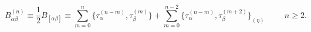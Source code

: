 \begin{equation}
  B_{\alpha\beta}^{(n)}\equiv
  \frac{1}{2}B_{[\alpha\beta]}\equiv \sum_{m=0}^n \{\tau_\alpha ^{(n-m)}, \tau_\beta
  ^{(m)}\}+\sum_{m=0}^{n-2} \{\tau_\alpha^{(n-m)}, \tau_\beta ^{(m+2)}\}_{(\eta)}\hspace
  {1cm} n\geq2.
  \label{a10}
  \end{equation}

